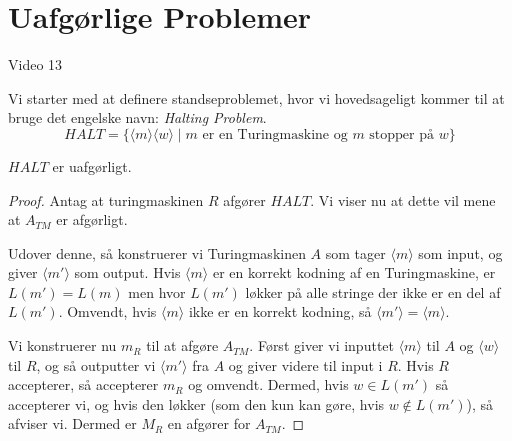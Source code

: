 \section{Uafgørlige Problemer}%
\label{sec:label}

\begin{note}[Kilder]
	Video 13
\end{note}

Vi starter med at definere standseproblemet, hvor vi hovedsageligt kommer til at bruge det engelske navn: \textit{Halting Problem}.
\begin{equation*}
	HALT = \{ \langle m \rangle \langle w \rangle \mid m \text{ er en Turingmaskine og } m \text{ stopper på }w\}
\end{equation*}

\begin{theorem}
	\label{teo:halt}
	$HALT$ er uafgørligt.
\end{theorem}

\begin{proof}
	Antag at turingmaskinen $R$ afgører $HALT$. Vi viser nu at dette vil mene at $A_{TM}$ er afgørligt.

	Udover denne, så konstruerer vi Turingmaskinen $A$ som tager \(\langle m \rangle \) som input, og giver \(\langle m' \rangle \) som output. Hvis \(\langle m \rangle \) er en korrekt kodning af en Turingmaskine, er $L(m') = L(m)$ men hvor $L(m')$ løkker på alle stringe der ikke er en del af $L(m')$. Omvendt, hvis $\langle m \rangle$ ikke er en korrekt kodning, så $\langle m' \rangle = \langle m \rangle$.

	Vi konstruerer nu $m_{R}$ til at afgøre $A_{TM}$. Først giver vi inputtet \(\langle m \rangle \) til $A$ og \(\langle w \rangle \) til $R$, og så outputter vi \(\langle m' \rangle \) fra $A$ og giver videre til input i $R$. Hvis $R$ accepterer, så accepterer $m_{R}$ og omvendt. Dermed, hvis $w \in L(m')$ så accepterer vi, og hvis den løkker (som den kun kan gøre, hvis $w \notin L(m')$), så afviser vi. Dermed er $M_{R}$ en afgører for $A_{TM}$.
\end{proof}

